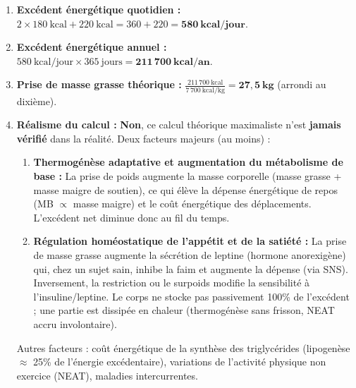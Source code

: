 \documentclass[11pt]{article}
\begin{document}
\begin{corrige}
\begin{enumerate}
\item \textbf{Excédent énergétique quotidien :}
$2 \times 180\ \text{kcal} + 220\ \text{kcal} = 360 + 220 = \mathbf{580\ kcal/jour}$.
\item \textbf{Excédent énergétique annuel :}
$580\ \text{kcal/jour} \times 365\ \text{jours} = \mathbf{211\,700\ kcal/an}$.
\item \textbf{Prise de masse grasse théorique :}
$\frac{211\,700\ \text{kcal}}{7\,700\ \text{kcal/kg}} = \mathbf{27,5\ kg}$ (arrondi au dixième).
\item \textbf{Réalisme du calcul :} \textbf{Non}, ce calcul théorique maximaliste n'est \textbf{jamais vérifié} dans la réalité. Deux facteurs majeurs (au moins) :
\begin{enumerate}
\item \textbf{Thermogénèse adaptative et augmentation du métabolisme de base :} La prise de poids augmente la masse corporelle (masse grasse + masse maigre de soutien), ce qui élève la dépense énergétique de repos (MB $\propto$ masse maigre) et le coût énergétique des déplacements. L'excédent net diminue donc au fil du temps.
\item \textbf{Régulation homéostatique de l'appétit et de la satiété :} La prise de masse grasse augmente la sécrétion de leptine (hormone anorexigène) qui, chez un sujet sain, inhibe la faim et augmente la dépense (via SNS). Inversement, la restriction ou le surpoids modifie la sensibilité à l'insuline/leptine. Le corps ne stocke pas passivement 100\% de l'excédent ; une partie est dissipée en chaleur (thermogénèse sans frisson, NEAT accru involontaire).
\end{enumerate}
Autres facteurs : coût énergétique de la synthèse des triglycérides (lipogenèse $\approx$ 25\% de l'énergie excédentaire), variations de l'activité physique non exercice (NEAT), maladies intercurrentes.
\end{enumerate}
\end{corrige}
\end{document}
